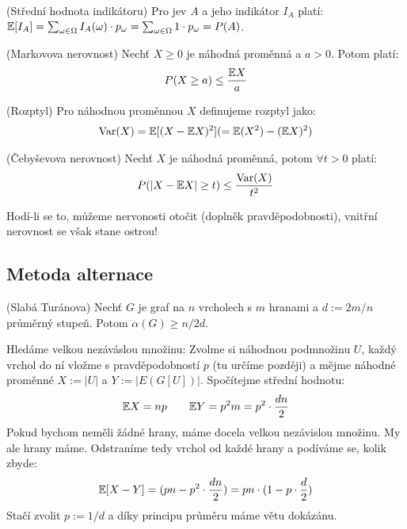 \poz (Střední hodnota indikátoru) Pro jev $A$ a jeho indikátor $I_A$ platí: 
$\mathbb{E}[I_A] = \sum_{\omega \in \Omega} I_A(\omega) \cdot p_\omega = \sum_{\omega 
\in \Omega} 1 \cdot p_\omega = P(A)$.

\vt (Markovova nerovnost) Nechť $X \geq 0$ je náhodná proměnná a $a > 0$. Potom 
platí:
\begin{align}
	P(X \geq a) \leq {\mathbb{E}X \over a}
\end{align}

\df (Rozptyl) Pro náhodnou proměnnou $X$ definujeme rozptyl jako:
\begin{align}
	\operatorname{Var}(X) = \mathbb{E}[(X - \mathbb{E} X)^2] ( = \mathbb{E}(X^2) - (\mathbb{E} X)^2 )
\end{align}

\vt (Čebyševova nerovnost) Nechť $X$ je náhodná proměnná, potom $\forall t > 0$ 
platí:
\begin{align}
	P(|X - \mathbb{E} X| \geq t) \leq {\operatorname{Var}(X) \over t^2}
\end{align}

\pzn Hodí-li se to, můžeme nervonosti otočit (doplněk pravděpodobnosti), vnitřní
nerovnost se však stane ostrou!



\subsection{Metoda alternace}

\vt (Slabá Turánova) Nechť $G$ je graf na $n$ vrcholech s $m$ hranami a $d := 
2m/n$ průměrný stupeň. Potom $\alpha(G) \geq n/2d$.

\dk Hledáme velkou nezáváslou množinu: Zvolme si náhodnou podmnožinu $U$, každý 
vrchol do ní vložme s pravděpodobností $p$ (tu určíme později) a mějme náhodné 
proměnné $X := |U|$ a $Y := |E(G[U])|$. Spočítejme střední hodnotu:
\begin{align}
	\mathbb{E} X = np \qquad \mathbb{E} Y = p^2 m = p^2 \cdot {dn \over 2 }
\end{align}
Pokud bychom neměli žádné hrany, máme docela velkou nezávislou množinu. My ale 
hrany máme. Odstraníme tedy vrchol od každé hrany a podíváme se, kolik zbyde:
\begin{align}
	\mathbb{E}[X - Y] = (pn - p^2 \cdot {dn \over 2}) = pn \cdot (1-p \cdot {d \over 2})
\end{align}
Stačí zvolit $ p := 1/d$ a díky principu průměru máme větu dokázánu.

